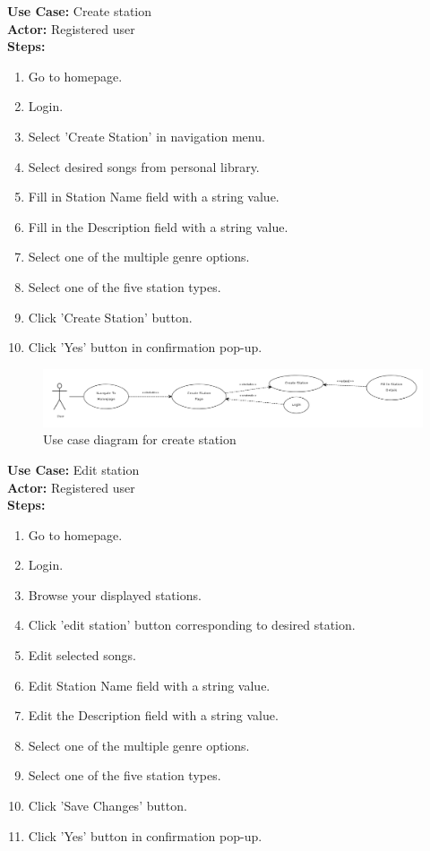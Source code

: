 \documentclass[a4paper, 12pt]{report}
\begin{document}
\textbf{Use Case:} Create station\\
\textbf{Actor:} Registered user\\
\textbf{Steps:} 
\begin{enumerate}
\item Go to homepage.
\item Login.
\item Select 'Create Station' in navigation menu.
\item Select desired songs from personal library.
\item Fill in Station Name field with a string value.
\item Fill in the Description field with a string value.
\item Select one of the multiple genre options.
\item Select one of the five station types.
\item Click 'Create Station' button.
\item Click 'Yes' button in confirmation pop-up.
\end{enumerate}
\begin{figure}[!htbp]
  \centering
    \includegraphics[width=1.0\textwidth]{usecase2.png}
    \caption{Use case diagram for create station}
\end{figure}
\textbf{Use Case:} Edit station\\
\textbf{Actor:} Registered user\\
\textbf{Steps:} 
\begin{enumerate}
\item Go to homepage.
\item Login.
\item Browse your displayed stations.
\item Click 'edit station' button corresponding to desired station.
\item Edit selected songs.
\item Edit Station Name field with a string value.
\item Edit the Description field with a string value.
\item Select one of the multiple genre options.
\item Select one of the five station types.
\item Click 'Save Changes' button.
\item Click 'Yes' button in confirmation pop-up.
\end{enumerate}
\end{document}
